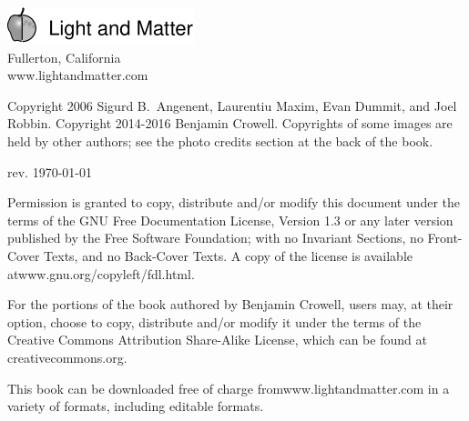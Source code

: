 \thispagestyle{empty}

\vspace{100mm}

\noindent
\includegraphics{cover/lmlogo}\\
Fullerton, California\\
www.lightandmatter.com

\vspace{20mm}
\noindent
Copyright 2006 Sigurd B.~Angenent, Laurentiu Maxim, Evan Dummit, and Joel Robbin.
Copyright 2014-2016 Benjamin Crowell.
Copyrights of some images are held by other authors; see the photo credits section
at the back of the book.

\vspace{20mm}
\noindent
rev. \today{}

\vspace{6mm}
\noindent
Permission is granted to copy, distribute and/or
modify this document under the terms of the GNU Free Documentation License, Version
1.3 or any later version published by the Free Software Foundation; with no Invariant
Sections, no Front-Cover Texts, and no Back-Cover Texts. A copy of the license is
available at\linebreak[4]
www.gnu.org/copyleft/fdl.html.

For the portions of the book authored by Benjamin Crowell, users may, at their option,
choose to copy, distribute and/or modify it
under the terms of the Creative Commons Attribution
Share-Alike License, which can be found at creativecommons.org.

This book can be downloaded free of charge
from\linebreak[4]
www.lightandmatter.com in a variety of formats,
including editable formats.
